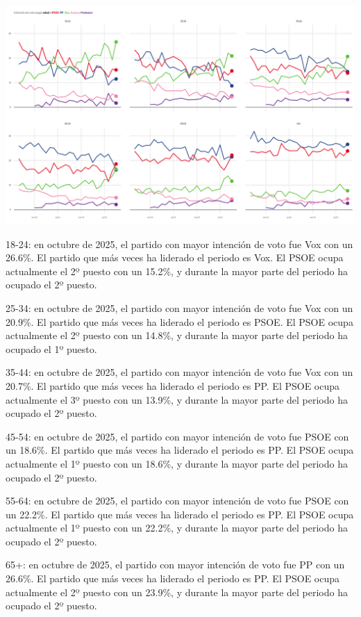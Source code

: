 \documentclass[
  letterpaper,
  DIV=11,
  numbers=noendperiod]{scrreprt}
\begin{document}
\includegraphics[width=8in,height=\textheight,keepaspectratio]{figures/p_idv_edad_static.png}

18-24: en octubre de 2025, el partido con mayor intención de voto fue
Vox con un 26.6\%. El partido que más veces ha liderado el periodo es
Vox. El PSOE ocupa actualmente el 2º puesto con un 15.2\%, y durante la
mayor parte del periodo ha ocupado el 2º puesto.

25-34: en octubre de 2025, el partido con mayor intención de voto fue
Vox con un 20.9\%. El partido que más veces ha liderado el periodo es
PSOE. El PSOE ocupa actualmente el 2º puesto con un 14.8\%, y durante la
mayor parte del periodo ha ocupado el 1º puesto.

35-44: en octubre de 2025, el partido con mayor intención de voto fue
Vox con un 20.7\%. El partido que más veces ha liderado el periodo es
PP. El PSOE ocupa actualmente el 3º puesto con un 13.9\%, y durante la
mayor parte del periodo ha ocupado el 2º puesto.

45-54: en octubre de 2025, el partido con mayor intención de voto fue
PSOE con un 18.6\%. El partido que más veces ha liderado el periodo es
PP. El PSOE ocupa actualmente el 1º puesto con un 18.6\%, y durante la
mayor parte del periodo ha ocupado el 2º puesto.

55-64: en octubre de 2025, el partido con mayor intención de voto fue
PSOE con un 22.2\%. El partido que más veces ha liderado el periodo es
PP. El PSOE ocupa actualmente el 1º puesto con un 22.2\%, y durante la
mayor parte del periodo ha ocupado el 2º puesto.

65+: en octubre de 2025, el partido con mayor intención de voto fue PP
con un 26.6\%. El partido que más veces ha liderado el periodo es PP. El
PSOE ocupa actualmente el 2º puesto con un 23.9\%, y durante la mayor
parte del periodo ha ocupado el 2º puesto.
\end{document}
